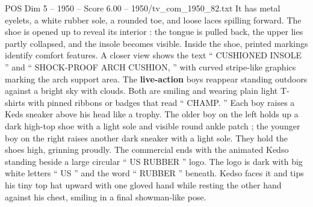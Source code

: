 \begin{textsample}{POS Dim 5 – 1950 – Score 6.00 – 1950/tv\_com\_1950\_82.txt}
It has metal eyelets, a white rubber sole, a rounded toe, and loose laces spilling forward.
The shoe is opened up to reveal its interior : the tongue is pulled back, the upper lies partly collapsed, and the insole becomes visible.
Inside the shoe, printed markings identify comfort features.
A closer view shows the text “ CUSHIONED INSOLE ” and “ SHOCK-PROOF ARCH CUSHION, ” with curved stripe-like graphics marking the arch support area.
The \textbf{live-action} boys reappear standing outdoors against a bright sky with clouds.
Both are smiling and wearing plain light T-shirts with pinned ribbons or badges that read “ CHAMP. ” Each boy raises a Keds sneaker above his head like a trophy.
The older boy on the left holds up a dark high-top shoe with a light sole and visible round ankle patch ; the younger boy on the right raises another dark sneaker with a light sole.
They hold the shoes high, grinning proudly.
The commercial ends with the animated Kedso standing beside a large circular “ US RUBBER ” logo.
The logo is dark with big white letters “ US ” and the word “ RUBBER ” beneath.
Kedso faces it and tips his tiny top hat upward with one gloved hand while resting the other hand against his chest, smiling in a final showman-like pose.

\end{textsample}
